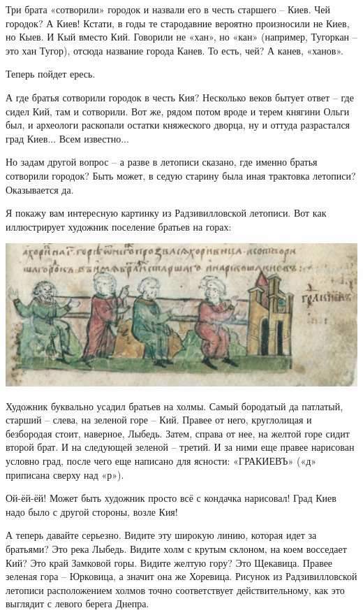 Три брата «сотворили» городок и назвали его в честь старшего – Киев. Чей городок? А Киев! Кстати, в годы те стародавние вероятно произносили не Киев, но Кыев. И Кый вместо Кий. Говорили не «хан», но «кан» (например, Тугоркан – это хан Тугор), отсюда название города Канев. То есть, чей? А канев, «ханов».

Теперь пойдет ересь.

А где братья сотворили городок в честь Кия? Несколько веков бытует ответ – где сидел Кий, там и сотворили. Вот же, рядом потом вроде и терем княгини Ольги был, и археологи раскопали остатки княжеского дворца, ну и оттуда разрастался град Киев... Всем известно...

Но задам другой вопрос – а разве в летописи сказано, где именно братья сотворили городок? Быть может, в седую старину была иная трактовка летописи? Оказывается да.

Я покажу вам интересную картинку из Радзивилловской летописи. Вот как иллюстрирует художник поселение братьев на горах:

\begin{center}
\includegraphics[width=\linewidth]{chast-colebanie-osnov/grad-kiev-urk/radz-tri-brata.jpg}
\end{center} 

Художник буквально усадил братьев на холмы. Самый бородатый да патлатый, старший – слева, на зеленой горе – Кий. Правее от него, круглолицая и безбородая стоит, наверное, Лыбедь. Затем, справа от нее, на желтой горе сидит второй брат. И на следующей зеленой – третий. И за ними еще правее нарисован условно град, после чего еще написано для ясности: «ГРАКИЕВЪ» («д» приписана сверху над «р»).

Ой-ёй-ёй! Может быть художник просто всё с кондачка нарисовал! Град Киев надо было с другой стороны, возле Кия!

А теперь давайте серьезно. Видите эту широкую линию, которая идет за братьями? Это река Лыбедь. Видите холм с крутым склоном, на коем восседает Кий? Это край Замковой горы. Видите желтую гору? Это Щекавица. Правее зеленая гора – Юрковица, а значит она же Хоревица. Рисунок из Радзивилловской летописи расположением холмов точно соответствует действительному, как это выглядит с левого берега Днепра.

